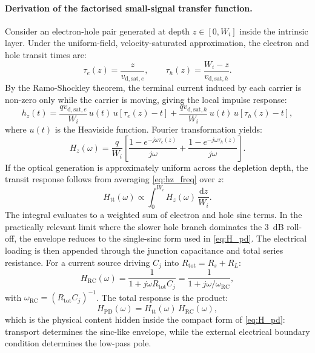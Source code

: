 \paragraph{Derivation of the factorised small-signal transfer function.}
Consider an electron-hole pair generated at depth $z\in[0,W_i]$ inside the
intrinsic layer. Under the uniform-field, velocity-saturated approximation, the
electron and hole transit times are:
\begin{equation}
    \tau_e(z)=\frac{z}{v_{\mathrm{d,sat},e}},
    \qquad
    \tau_h(z)=\frac{W_i-z}{v_{\mathrm{d,sat},h}}.
    \label{eq:tau_depth}
\end{equation}
By the Ramo-Shockley theorem, the terminal current induced by each carrier is
non-zero only while the carrier is moving, giving the local impulse response:
\begin{equation}
    h_z(t)
    = \frac{qv_{\mathrm{d,sat},e}}{W_i}\,
      u(t)\,u\!\left[\tau_e(z)-t\right]
    + \frac{qv_{\mathrm{d,sat},h}}{W_i}\,
      u(t)\,u\!\left[\tau_h(z)-t\right],
    \label{eq:hz_local}
\end{equation}
where $u(t)$ is the Heaviside function. Fourier transformation yields:
\begin{equation}
    H_z(\omega)
    = \frac{q}{W_i}\left[
        \frac{1-e^{-j\omega\tau_e(z)}}{j\omega}
      + \frac{1-e^{-j\omega\tau_h(z)}}{j\omega}
      \right].
    \label{eq:hz_freq}
\end{equation}
If the optical generation is approximately uniform across the depletion depth,
the transit response follows from averaging \cref{eq:hz_freq} over $z$:
\begin{equation}
    H_{\mathrm{tt}}(\omega)\propto
    \int_0^{W_i} H_z(\omega)\,\frac{\mathrm{d}z}{W_i}.
    \label{eq:htt_integral}
\end{equation}
The integral evaluates to a weighted sum of electron and hole sinc terms. In
the practically relevant limit where the slower hole branch dominates the
\SI{3}{dB} roll-off, the envelope reduces to the single-sinc form used in
\cref{eq:H_pd}. The electrical loading is then appended through the junction
capacitance and total series resistance. For a current source driving
$C_j$ into $R_{\mathrm{tot}}=R_s+R_L$:
\begin{equation}
    H_{\mathrm{RC}}(\omega)
    = \frac{1}{1+j\omega R_{\mathrm{tot}}C_j}
    = \frac{1}{1+j\omega/\omega_{\mathrm{RC}}},
    \label{eq:hrc_transfer}
\end{equation}
with $\omega_{\mathrm{RC}}=(R_{\mathrm{tot}}C_j)^{-1}$. The total response is
the product:
\begin{equation}
    H_{\mathrm{PD}}(\omega)
    = H_{\mathrm{tt}}(\omega)\,H_{\mathrm{RC}}(\omega),
    \label{eq:hpd_factorised}
\end{equation}
which is the physical content hidden inside the compact form of
\cref{eq:H_pd}: transport determines the sinc-like envelope, while the external
electrical boundary condition determines the low-pass pole.

